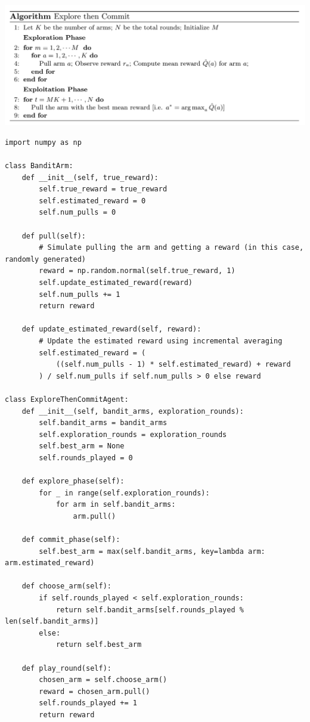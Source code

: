 \documentclass{article}
\begin{document}
\begin{center}
    \includegraphics[scale = 0.55]{pic2.png}    
\end{center}

\begin{lstlisting}
import numpy as np

class BanditArm:
    def __init__(self, true_reward):
        self.true_reward = true_reward
        self.estimated_reward = 0
        self.num_pulls = 0

    def pull(self):
        # Simulate pulling the arm and getting a reward (in this case, randomly generated)
        reward = np.random.normal(self.true_reward, 1)
        self.update_estimated_reward(reward)
        self.num_pulls += 1
        return reward

    def update_estimated_reward(self, reward):
        # Update the estimated reward using incremental averaging
        self.estimated_reward = (
            ((self.num_pulls - 1) * self.estimated_reward) + reward
        ) / self.num_pulls if self.num_pulls > 0 else reward

class ExploreThenCommitAgent:
    def __init__(self, bandit_arms, exploration_rounds):
        self.bandit_arms = bandit_arms
        self.exploration_rounds = exploration_rounds
        self.best_arm = None
        self.rounds_played = 0

    def explore_phase(self):
        for _ in range(self.exploration_rounds):
            for arm in self.bandit_arms:
                arm.pull()

    def commit_phase(self):
        self.best_arm = max(self.bandit_arms, key=lambda arm: arm.estimated_reward)

    def choose_arm(self):
        if self.rounds_played < self.exploration_rounds:
            return self.bandit_arms[self.rounds_played % len(self.bandit_arms)]
        else:
            return self.best_arm

    def play_round(self):
        chosen_arm = self.choose_arm()
        reward = chosen_arm.pull()
        self.rounds_played += 1
        return reward


\end{lstlisting}
\end{document}
